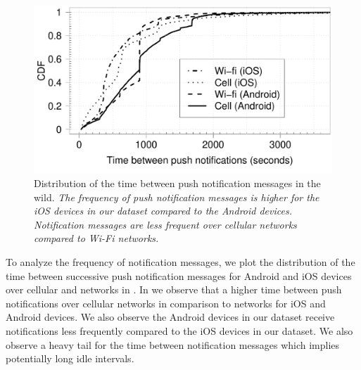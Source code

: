 \begin{figure}
\centering
\includegraphics[width=\columnwidth]{plots/push_compare_os_tech_wild_distrib.pdf}
\caption{Distribution of the time between push notification messages in the wild. \emph{The frequency of push notification messages is higher for the iOS devices in our dataset compared to the Android devices. Notification messages are less frequent over cellular networks compared to Wi-Fi networks.}}
\label{fig:push-wild-compare-ostech}
\end{figure}

To analyze the frequency of notification messages, we plot the distribution of the time between successive push notification messages for Android and iOS devices over cellular and \wifi networks in .
In  we observe that a higher time between push notifications over cellular networks in comparison to \wifi networks for iOS and Android devices.  
We also observe the Android devices in our dataset receive notifications less frequently compared to the iOS devices in our dataset. 
We also observe a heavy tail for the time between notification messages which implies potentially long idle intervals.


